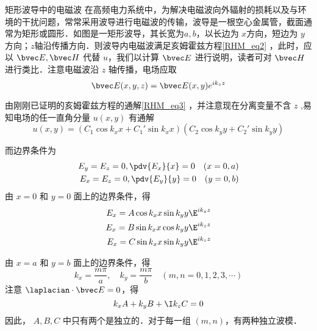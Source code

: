 \begin{example}{矩形波导中的电磁波}
在高频电力系统中，为解决电磁波向外辐射的损耗以及与环境的干扰问题，常常采用波导进行电磁波的传输，波导是一根空心金属管，截面通常为矩形或圆形．如图是一矩形波导，其长宽为$a,b$，以长边为 $x$方向，短边为 $y$ 方向；$z$轴沿传播方向．则波导内电磁波满足亥姆霍兹方程\autoref{RHM_eq2} ，此时，应以 $\bvec E,\bvec H$ 代替 $u$，我们以计算 $\bvec E$ 进行说明，读者可对 $\bvec H$ 进行类比．注意电磁波沿 $z$ 轴传播，电场应取
\begin{equation}
\bvec E(x,y,z)=\bvec E(x,y)e^{ik_z z}
\end{equation}

由刚刚已证明的亥姆霍兹方程的通解\autoref{RHM_eq3} ，并注意现在分离变量不含 $z$ ,易知电场的任一直角分量 $u(x,y)$ 有通解
\begin{equation}
u(x,y)=(C_1\cos k_xx+C_1'\sin k_xx)(C_2\cos k_yy+C_2'\sin k_yy)
\end{equation}

而边界条件为
\begin{equation}
\begin{aligned}
E_y=E_z=0,\pdv{E_x}{x}=0\quad(x=0,a)\\
E_x=E_z=0,\pdv{E_y}{y}=0\quad(y=0,b)
\end{aligned}
\end{equation}
由 $x=0$ 和 $y=0$ 面上的边界条件，得
\begin{equation}
\begin{aligned}
E_x=A\cos k_x x\sin k_yy\E^{ik_zz} \\
E_x=B\sin k_x x\cos k_yy\E^{ik_zz} \\
E_x=C\sin k_x x\sin k_yy\E^{ik_zz} 
\end{aligned}
\end{equation}
 
由 $x=a$ 和 $y=b$ 面上的边界条件，得 
\begin{equation}
k_x=\frac{m\pi}{a},\quad k_y=\frac{m\pi}{b}\quad(m,n=0,1,2,3,\cdots)
\end{equation}
注意 $\laplacian \cdot\bvec E=0$，得
\begin{equation}
k_xA+k_yB+\I k_zC=0
\end{equation}
因此， $A,B,C$ 中只有两个是独立的．对于每一组 $(m,n)$，有两种独立波模．
\end{example}